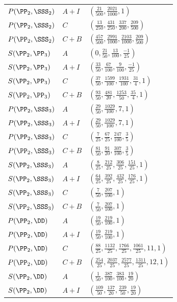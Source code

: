 \begin{longtable}{lll}
$P(\PP_2,\SSS_2)$ & $A+I$ & $(\frac{21}{500}, \frac{2021}{1000}, 1)$ \\
$P(\PP_2,\SSS_2)$ & $C$ & $(\frac{13}{250}, \frac{431}{250}, \frac{337}{200}, \frac{209}{500})$ \\
$P(\PP_2,\SSS_2)$ & $C+B$ & $(\frac{457}{500}, \frac{2991}{1000}, \frac{2103}{1000}, \frac{209}{500})$ \\
$S(\PP_2,\PP_3)$ & $A$ & $(0, \frac{21}{50}, \frac{13}{100}, \frac{-1}{25})$ \\
$S(\PP_2,\PP_3)$ & $A+I$ & $(\frac{33}{50}, \frac{67}{100}, \frac{9}{100}, \frac{-1}{25})$ \\
$S(\PP_2,\PP_3)$ & $C$ & $(\frac{37}{50}, \frac{1599}{100}, \frac{1931}{100}, \frac{31}{4}, 1)$ \\
$S(\PP_2,\PP_3)$ & $C+B$ & $(\frac{93}{50}, \frac{481}{20}, \frac{1253}{50}, \frac{35}{4}, 1)$ \\
$P(\PP_2,\SSS_3)$ & $A$ & $(\frac{29}{50}, \frac{1029}{100}, 7, 1)$ \\
$P(\PP_2,\SSS_3)$ & $A+I$ & $(\frac{29}{50}, \frac{1029}{100}, 7, 1)$ \\
$P(\PP_2,\SSS_3)$ & $C$ & $(\frac{7}{25}, \frac{67}{25}, \frac{247}{100}, \frac{3}{5})$ \\
$P(\PP_2,\SSS_3)$ & $C+B$ & $(\frac{81}{50}, \frac{91}{20}, \frac{307}{100}, \frac{3}{5})$ \\
$S(\PP_2,\SSS_3)$ & $A$ & $(\frac{8}{25}, \frac{212}{25}, \frac{306}{25}, \frac{151}{25}, 1)$ \\
$S(\PP_2,\SSS_3)$ & $A+I$ & $(\frac{64}{25}, \frac{392}{25}, \frac{432}{25}, \frac{176}{25}, 1)$ \\
$S(\PP_2,\SSS_3)$ & $C$ & $(\frac{7}{50}, \frac{207}{100}, 1)$ \\
$S(\PP_2,\SSS_3)$ & $C+B$ & $(\frac{7}{50}, \frac{207}{100}, 1)$ \\
$P(\PP_2,\DD)$ & $A$ & $(\frac{19}{50}, \frac{219}{100}, 1)$ \\
$P(\PP_2,\DD)$ & $A+I$ & $(\frac{19}{50}, \frac{219}{100}, 1)$ \\
$P(\PP_2,\DD)$ & $C$ & $(\frac{88}{25}, \frac{1132}{25}, \frac{1766}{25}, \frac{1061}{25}, 11, 1)$ \\
$P(\PP_2,\DD)$ & $C+B$ & $(\frac{254}{25}, \frac{2037}{25}, \frac{2577}{25}, \frac{1311}{25}, 12, 1)$ \\
$S(\PP_2,\DD)$ & $A$ & $(\frac{1}{50}, \frac{387}{100}, \frac{383}{100}, \frac{19}{20})$ \\
$S(\PP_2,\DD)$ & $A+I$ & $(\frac{109}{50}, \frac{137}{20}, \frac{239}{50}, \frac{19}{20})$ \\

\end{longtable}
